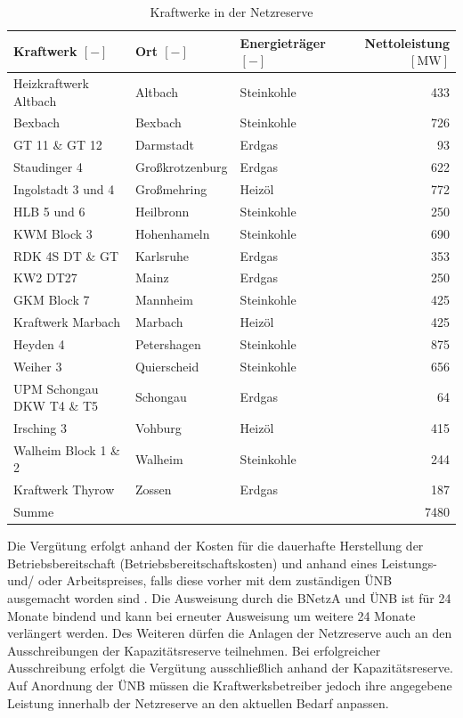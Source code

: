 			\begin{table}[H]
				\centering
				\caption{Kraftwerke in der Netzreserve \cite{Excel_Kraftwerksliste}}			
				\label{Tab. Kraftwerke Netzreserve} 
				\begin{tabular}{lllr}
					\hline
					\makecell[c]{Kraftwerk \\ $\left[-\right]$} & \makecell[c]{Ort \\ $\left[-\right]$} & \makecell[c]{Energieträger \\ $\left[-\right]$} & \makecell[c]{Nettoleistung \\ $\left[\si{\mega\watt}\right]$} \\ \hline 
					Heizkraftwerk Altbach & Altbach & Steinkohle & \num{433} \\
					Bexbach & Bexbach & Steinkohle & \num{726} \\
					GT 11 \& GT 12 & Darmstadt & Erdgas & \num{93} \\
					Staudinger 4 & Großkrotzenburg & Erdgas & \num{622} \\
					Ingolstadt 3 und 4 & Großmehring & Heizöl & \num{772} \\
					HLB 5 und 6 & Heilbronn & Steinkohle & \num{250} \\
					KWM Block 3 & Hohenhameln & Steinkohle & \num{690} \\ 
					RDK 4S DT \& GT & Karlsruhe & Erdgas & \num{353} \\
					KW2 DT27 & Mainz & Erdgas & \num{250} \\
					GKM Block 7 & Mannheim & Steinkohle & \num{425} \\
					Kraftwerk Marbach & Marbach & Heizöl & \num{425} \\
					Heyden 4 & Petershagen & Steinkohle & \num{875} \\
					Weiher 3 & Quierscheid & Steinkohle & \num{656} \\
					UPM Schongau DKW T4 \& T5 & Schongau & Erdgas & \num{64} \\
					Irsching 3 & Vohburg & Heizöl & \num{415} \\
					Walheim Block 1 \& 2 & Walheim & Steinkohle & \num{244} \\
					Kraftwerk Thyrow & Zossen & Erdgas & \num{187} \\ \hline
					Summe &  &  & \num{7480} \\ \hline
				\end{tabular}
			\end{table}
			
			Die Vergütung erfolgt anhand der Kosten für die dauerhafte Herstellung der Betriebsbereitschaft (Betriebsbereitschaftskosten) und anhand eines Leistungs- und/ oder Arbeitspreises, falls diese vorher mit dem zuständigen ÜNB ausgemacht worden sind \cite{EnWG}.
			Die Ausweisung durch die BNetzA und ÜNB ist für 24 Monate bindend und kann bei erneuter Ausweisung um weitere 24 Monate verlängert werden.		
			Des Weiteren dürfen die Anlagen der Netzreserve auch an den Ausschreibungen der Kapazitätsreserve teilnehmen.
			Bei erfolgreicher Ausschreibung erfolgt die Vergütung ausschließlich anhand der Kapazitätsreserve.
			Auf Anordnung der ÜNB müssen die Kraftwerksbetreiber jedoch ihre angegebene Leistung innerhalb der Netzreserve an den aktuellen Bedarf anpassen.
			
